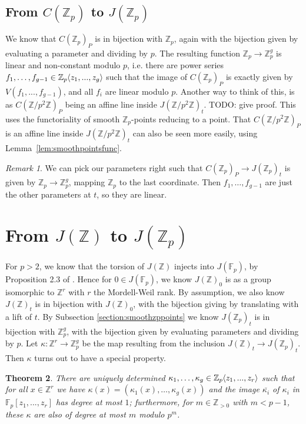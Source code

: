 \documentclass[12pt]{article}
\newcommand{\Z}{\mathbb{Z}}
\newcommand{\F}{\mathbb{F}}
\renewcommand{\angle}[1]{\hspace{-2pt}\left\langle #1 \right\rangle}
\theoremstyle{plain}
\newtheorem{thm}{Theorem}[section] %
\theoremstyle{definition}
\theoremstyle{remark}
\newtheorem{rem}[thm]{Remark} %
\begin{document}
\subsection{From \texorpdfstring{$C(\Z_p)$}{C(Z\_p)} to \texorpdfstring{$J(\Z_p)$}{J(Z\_p)}}
\label{subsection:czptojzp}
We know that $C(\Z_p)_P$ is in bijection with $\Z_p$, again with the bijection given by evaluating a parameter and dividing by $p$. The resulting function $\Z_p \to \Z_p^g$ is linear and non-constant modulo $p$, i.e. there are power series $f_1,\dots,f_{g-1} \in \Z_p\angle{z_1,...,z_g}$ such that the image of $C(\Z_p)_P$ is exactly given by $V(f_1,...,f_{g-1})$, and all $f_i$ are linear modulo $p$. Another way to think of this, is as $C(\Z/p^2\Z)_P$ being an affine line inside $J(\Z/p^2\Z)_t$.
TODO: give proof. This uses the functoriality of smooth $\Z_p$-points reducing to a point. That $C(\Z/p^2\Z)_P$ is an affine line inside $J(\Z/p^2\Z)_t$ can also be seen more easily, using Lemma~\ref{lem:smoothpointsfunc}. 

\begin{rem}
\label{rem:fislinear}
We can pick our parameters right such that $C(\Z_p)_P \to J(\Z_p)_t$ is given by $\Z_p \to \Z_p^g$, mapping $\Z_p$ to the last coordinate. Then $f_1,\dots,f_{g-1}$ are just the other parameters at $t$, so they are linear.
\end{rem}

\section{From \texorpdfstring{$J(\Z)$}{J(Z)} to \texorpdfstring{$J(\Z_p)$}{J(Z\_p)}}
\label{section:kappa}
For $p > 2$, we know that the torsion of $J(\Z)$ injects into $J(\F_p)$, by Proposition 2.3 of \cite{pierre2000}. Hence for $0 \in J(\F_p)$, we know $J(\Z)_0$ is as a group isomorphic to $\Z^r$ with $r$ the Mordell-Weil rank. By assumption, we also know $J(\Z)_t$ is in bijection with $J(\Z)_0$, with the bijection giving by translating with a lift of $t$. By Subsection \ref{section:smoothzppoints} we know $J(\Z_p)_t$ is in bijection with $\Z_p^{g}$, with the bijection given by evaluating parameters and dividing by $p$. Let $\kappa: \Z^r \to \Z_p^g$ be the map resulting from the inclusion $J(\Z)_t \to J(\Z_p)_t$. Then $\kappa$ turns out to have a special property.

\begin{thm}
\label{thm:kappanice}
There are uniquely determined $\kappa_1,\dots,\kappa_g \in \Z_p\angle{z_1,...,z_r}$ such that for all $x \in \Z^r$ we have $\kappa(x) = (\kappa_1(x),\dots,\kappa_g(x))$ and the image $\overline{\kappa_i}$ of $\kappa_i$ in $\F_p[z_1,...,z_r]$ has degree at most $1$; furthermore, for $m \in \Z_{>0}$ with $m<p-1$, these $\kappa$ are also of degree at most $m$ modulo $p^m$.
\end{thm}
\end{document}
